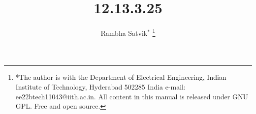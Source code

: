 \documentclass[journal,12pt,twocolumn]{IEEEtran}
\theoremstyle{remark}
\begin{document}
%




\vspace{3cm}

\title{12.13.3.25}
\author{ Rambha Satvik$^{*}$%
	\thanks{*The author is with the Department
		of Electrical Engineering, Indian Institute of Technology, Hyderabad
		502285 India e-mail: ee22btech11043@iith.ac.in. All content in this manual is released under GNU GPL.  Free and open source.}
	
}	


%
%
%

% 
%



% 
\end{document}
